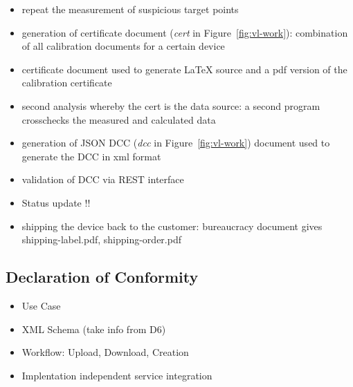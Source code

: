 \documentclass[3p,times,procedia]{elsarticle}
\begin{document}
\begin{itemize}
\item repeat the measurement of suspicious target points
\item generation of certificate document (\emph{cert} in  Figure~\ref{fig:vl-work}): 
    combination of all calibration documents for a certain device
\item certificate document used to generate LaTeX source and a pdf
  version of the calibration certificate
\item second analysis whereby the cert is the data source: a second
  program crosschecks the measured and calculated data
\item generation of JSON DCC (\emph{dcc} in  Figure~\ref{fig:vl-work}) 
    document used to generate the DCC in xml
  format 
\item validation of DCC via REST interface
\item Status update !!
\item shipping the device back to the customer: bureaucracy
  document gives shipping-label.pdf, shipping-order.pdf
\end{itemize}


\subsection{Declaration of Conformity}

\begin{itemize}
    \item Use Case
    \item XML Schema (take info from D6)
    \item Workflow: Upload, Download, Creation
    \item Implentation independent service integration
\end{itemize}
\end{document}
